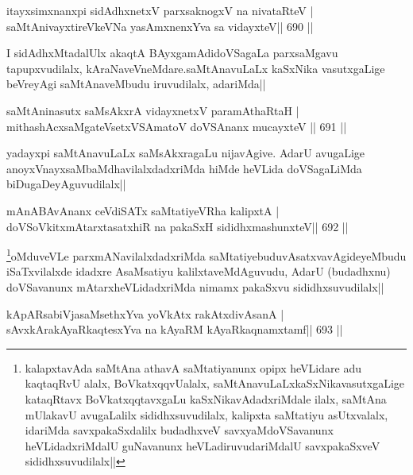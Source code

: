 \begin{shl}
itayxsimxnanxpi sidAdhxnetxV parxsaknogxV na nivataRteV | \\
saMtAnivayxtireVkeVNa yasAmxnenxYva sa vidayxteV\hfill ||  690 ||  
\end{shl}

\begin{artha}
I sidAdhxMtadalUlx akaqtA BAyxgamAdidoVSagaLa parxsaMgavu tapupxvudilalx, kAraNaveVneMdare.saMtAnavuLaLx kaSxNika vasutxgaLige beVreyAgi saMtAnaveMbudu iruvudilalx, adariMda||
\end{artha}

\begin{shl}
saMtAninasutx saMsAkxrA vidayxnetxV paramAthaRtaH | \\
mithashAcxsaMgateVsetxVSAmatoV doVSAnanx mucayxteV \hfill||  691 ||  
\end{shl}

\begin{artha}
yadayxpi saMtAnavuLaLx saMsAkxragaLu nijavAgive. AdarU avugaLige anoyxVnayxsaMbaMdhavilalxdadxriMda hiMde heVLida doVSagaLiMda biDugaDeyAguvudilalx||
\end{artha}

\begin{shl}
mAnABAvAnanx ceVdiSATx saMtatiyeVRha kalipxtA | \\
doVSoVkitxmAtarxtasatxhiR na pakaSxH sididhxmashunxteV\hfill ||  692 ||  
\end{shl}

\begin{artha}
\footnote{kalapxtavAda saMtAna athavA saMtatiyanunx opipx heVLidare adu kaqtaqRvU alalx,  BoVkatxqqvUalalx, saMtAnavuLaLxkaSxNikavasutxgaLige kataqRtavx BoVkatxqqtavxgaLu kaSxNikavAdadxriMdale ilalx, saMtAna mUlakavU avugaLalilx sididhxsuvudilalx, kalipxta saMtatiyu asUtxvalalx, idariMda savxpakaSxdalilx budadhxveV savxyaMdoVSavanunx heVLidadxriMdalU guNavanunx heVLadiruvudariMdalU savxpakaSxveV sididhxsuvudilalx||}oMduveVLe parxmANavilalxdadxriMda saMtatiyebuduvAsatxvavAgideyeMbudu iSaTxvilalxde idadxre AsaMsatiyu kalilxtaveMdAguvudu, AdarU (budadhxnu) doVSavanunx mAtarxheVLidadxriMda nimamx pakaSxvu sididhxsuvudilalx||
\end{artha}


\begin{shl}
kApARsabiVjasaMsethxYva yoVkAtx rakAtxdivAsanA | \\
sAvxkArakAyaRkaqtesxYva na kAyaRM kAyaRkaqnamxtamf\hfill||  693 ||  
\end{shl}

